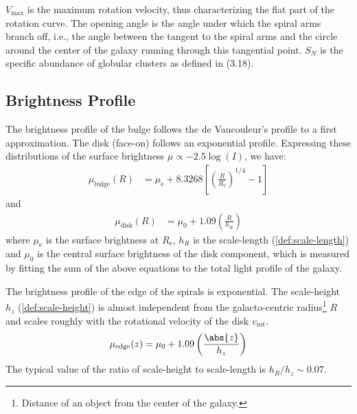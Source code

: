 \documentclass[a4paper,11pt]{report}
\newcommand{\Reff}{{R_\text{e}}}
\newcommand{\mueff}{{\mu_\text{e}}}
\begin{document}
\begin{table}[h!]
\vspace{0.3cm}

\begin{minipage}{0.95\textwidth}
\small
$V_{\max}$ is the maximum rotation velocity, thus characterizing the flat part of the rotation curve. The opening angle is the angle under which the spiral arms branch off, i.e., the angle between the tangent to the spiral arms and the circle around the center of the galaxy running through this tangential point. $S_N$ is the specific abundance of globular clusters as defined in (3.18).
\end{minipage}

\end{table}


\subsection{Brightness Profile}
The brightness profile of the bulge follows the de Vaucouleur's profile to a first approximation. The disk (face-on) follows an exponential profile. Expressing these distributions of the surface brightness $\mu \propto -2.5 \log(I)$, we have:
\begin{align}
  \mu_\text{bulge}(R) &= \mueff + 8.3268 \left[ \left( \frac{R}{\Reff} \right)^{1/4} - 1 \right] \label{eq:bulge brightness}
\end{align}
and
\begin{align}
  \mu_\text{disk}(R) &= \mu_0 + 1.09 \left( \frac{R}{h_R} \right) \label{eq:disk brightness}
\end{align}
where $\mueff$ is the surface brightness at $\Reff$, $h_R$ is the scale-length (\ref{def:scale-length}) and $\mu_0$ is the central surface brightness of the disk component, which is measured by fitting the sum of the above equations to the total light profile of the galaxy.

\vspace{1em}

The brightness profile of the edge of the spirals is exponential. The scale-height $h_z$ (\ref{def:scale-height}) is almost independent from the galacto-centric radius\footnote{Distance of an object from the center of the galaxy.} $R$ and scales roughly with the rotational velocity of the disk $v_\text{rot}$.
\begin{align}
  \mu_\text{edge}(z) = \mu_0 + 1.09\left( \frac{\abs{z}}{h_z} \right) \label{eq:edge brightness}
\end{align}
The typical value of the ratio of scale-height to scale-length is $h_R / h_z \sim 0.07$.
\end{document}
